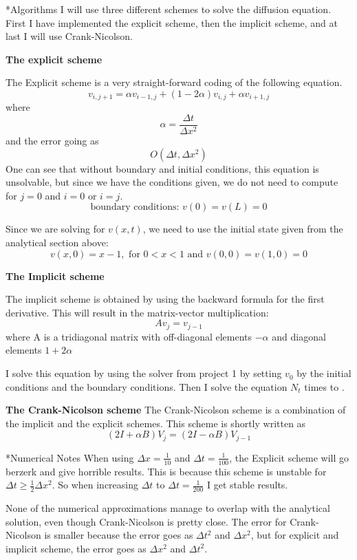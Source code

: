 \documentclass[a4paper, 12pt, titlepage]{article}
\newcommand{\f}[2]{\frac{#1}{#2}}
\newcommand{\beq}{\begin{equation*}}
\newcommand{\eeq}{\end{equation*}}
\begin{document}
  \begin{section}*{Algorithms}
    I will use three different schemes to solve the diffusion equation. First I have implemented
    the explicit scheme, then the implicit scheme, and at last I will use Crank-Nicolson.
    \par 
    {\bf The explicit scheme} \par
      The Explicit scheme is a very straight-forward coding of the following equation. 
			\beq
			v_{i,j+1} = \alpha v_{i-1,j} + (1-2\alpha)v_{i,j} + \alpha v_{i+1,j}
			\eeq
      where \beq \alpha = \f{\Delta t}{\Delta x^2} \eeq    
      and the error going as \beq O(\Delta t, \Delta x^2) \eeq
      One can see that without boundary and initial conditions, this equation is unsolvable, but
      since we have the conditions given, we do not need to compute for $j=0$ and $i=0$ or $i=j$.
      \beq \text{boundary conditions: } v(0) = v(L) = 0 \eeq 
      
      Since we are solving for $v(x,t)$, we need to use the initial state given from the analytical 
      section above: \beq v(x,0) = x - 1, \text{ for } 0<x<1 \text{ and } v(0,0) = v(1,0) = 0 \eeq
      
    
    {\bf The Implicit scheme} \par
      The implicit scheme is obtained by using the backward formula for the first derivative. This will
      result in the matrix-vector multiplication: \beq Av_j = v_{j-1} \eeq where A is a tridiagonal matrix
      with off-diagonal elements $-\alpha$ and diagonal elements $1+2\alpha$\par
      I solve this equation by using the solver from project 1 by setting $v_0$ by the initial conditions 
      and the boundary conditions. Then I solve the equation $N_t$ times to . \par
    {\bf The Crank-Nicolson scheme}
      The Crank-Nicolson scheme is a combination of the implicit and the explicit schemes. 
      This scheme is shortly written as \beq (2I + \alpha B) V_j = (2I - \alpha B) V_{j-1} \eeq
     
  \end{section}
  \begin{section}*{Numerical Notes}
   When using $\Delta x = \f{1}{10}$ and $\Delta t = \f{1}{100}$, the Explicit scheme will go berzerk and give horrible 
   results. This is because this scheme is unstable for $\Delta t \geq \f{1}{2}\Delta x^2$. So when increasing
   $\Delta t$ to $\Delta t = \f{1}{200}$ I get stable results. 
   
   None of the numerical approximations manage to overlap with the analytical solution, even though 
   Crank-Nicolson is pretty close. The error for Crank-Nicolson is smaller because the error goes as
   $\Delta t^2$ and $\Delta x^2$, but for explicit and implicit scheme, the error goes as $\Delta x^2$
   and $\Delta t^2$.
  \end{section}
\end{document}

